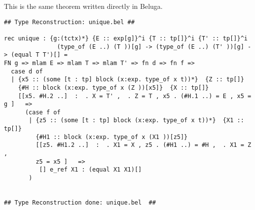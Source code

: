 \documentclass[12pt]{article}
\begin{document}
This is the same theorem written directly in \textmd{Beluga}.
\footnotesize\begin{verbatim}
## Type Reconstruction: unique.bel ##

rec unique : {g:(tctx)*} {E :: exp[g]}^i {T :: tp[]}^i {T' :: tp[]}^i
               (type_of (E ..) (T ))[g] -> (type_of (E ..) (T' ))[g] -> (equal T T')[] =
FN g => mlam E => mlam T => mlam T' => fn d => fn f =>
  case d of
  | {x5 :: (some [t : tp] block (x:exp. type_of x t))*}  {Z :: tp[]}
    {#H :: block (x:exp. type_of x (Z ))[x5]}  {X :: tp[]}
    [[x5. #H.2 ..]  :  . X = T' ,  . Z = T , x5 . (#H.1 ..) = E , x5 = g ]   =>
      (case f of
       | {z5 :: (some [t : tp] block (x:exp. type_of x t))*}  {X1 :: tp[]}
         {#H1 :: block (x:exp. type_of x (X1 ))[z5]}
         [[z5. #H1.2 ..]  :  . X1 = X , z5 . (#H1 ..) = #H ,  . X1 = Z ,
         z5 = x5 ]   =>
          [] e_ref X1 : (equal X1 X1)[]
       )


## Type Reconstruction done: unique.bel  ##

\end{verbatim}
\end{document}
